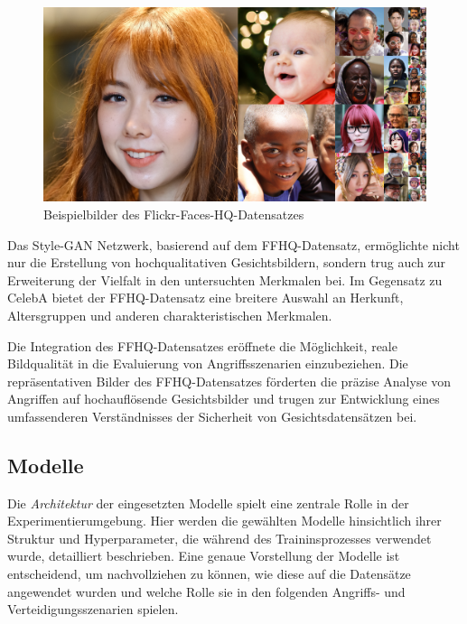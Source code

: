 \begin{figure}[H]
	\centering
	\includegraphics[width=0.4\linewidth]{Bilder/ffhq.png}
	\caption{Beispielbilder des Flickr-Faces-HQ-Datensatzes}
	\label{img:ffhq}
\end{figure}

Das Style-GAN Netzwerk, basierend auf dem FFHQ-Datensatz, ermöglichte nicht nur die Erstellung von hochqualitativen Gesichtsbildern, sondern trug auch zur Erweiterung der Vielfalt in den untersuchten Merkmalen bei. Im Gegensatz zu CelebA bietet der FFHQ-Datensatz eine breitere Auswahl an Herkunft, Altersgruppen und anderen charakteristischen Merkmalen.

Die Integration des FFHQ-Datensatzes eröffnete die Möglichkeit, reale Bildqualität in die Evaluierung von Angriffsszenarien einzubeziehen. Die repräsentativen Bilder des FFHQ-Datensatzes förderten die präzise Analyse von Angriffen auf hochauflösende Gesichtsbilder und trugen zur Entwicklung eines umfassenderen Verständnisses der Sicherheit von Gesichtsdatensätzen bei.
\subsection{Modelle}
Die \textit{Architektur} der eingesetzten Modelle spielt eine zentrale Rolle in der Experimentierumgebung. Hier werden die gewählten Modelle hinsichtlich ihrer Struktur und Hyperparameter, die während des Traininsprozesses verwendet wurde, detailliert beschrieben. Eine genaue Vorstellung der Modelle ist entscheidend, um nachvollziehen zu können, wie diese auf die Datensätze angewendet wurden und welche Rolle sie in den folgenden Angriffs- und Verteidigungsszenarien spielen.

